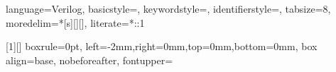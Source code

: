 
{
language=Verilog,
basicstyle=\small\ttfamily,
keywordstyle=\color{vblue},
identifierstyle=\color{black},
tabsize=8,
moredelim=*[s][]{[}{]},
literate=*{:}{:}1
}

\makeatletter
\newcommand*\@lbracket{[}
\newcommand*\@rbracket{]}
\newcommand*\@colon{:}
\newcommand*\colorIndex{%
	\edef\@temp{\the\lst@token}%
	\ifx\@temp\@lbracket \color{black}%
	\else\ifx\@temp\@rbracket \color{black}%
		\else\ifx\@temp\@colon \color{black}%
			\else \color{vorange}%
			\fi\fi\fi
}
\makeatother

\newcommand{\cd}[1]{ \lstinline{#1} }

\usepackage{tcolorbox}
\newtcbox{\codeinline}[1][]{
	boxrule=0pt,
	left=-2mm,right=0mm,top=0mm,bottom=0mm,
	box align=base,
	nobeforeafter,
	fontupper=\ttfamily
}
\newcommand{\code}[2]{\codeinline{\lstinline[#1]!#2!}}

\newif\iffigure
\figurefalse
\figuretrue

\makeatletter

\makeatother

\makeatletter
\newcommand*{\themonth}{\two@digits\month}
\newcommand*{\theday}{\two@digits\day}
\makeatother

\renewcommand{\theequation}{\arabic{equation}}
\renewcommand{\today}{{\the\year}/{\themonth}/{\theday}}
\renewcommand{\thesubsection}{\arabic{subsection}}
\AtBeginDocument{
	\preto{\section}{\setcounter{subsection}{0}}
}


\allowdisplaybreaks